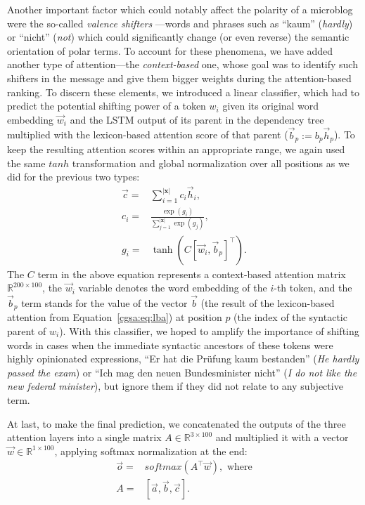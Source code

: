 Another important factor which could notably affect the polarity of a
microblog were the so-called \emph{valence shifters}
\cite[][]{Polanyi:06}---words and phrases such as ``kaum''
(\emph{hardly}) or ``nicht'' (\emph{not}) which could significantly
change (or even reverse) the semantic orientation of polar terms.  To
account for these phenomena, we have added another type of
attention---the \emph{context-based} one, whose goal was to identify
such shifters in the message and give them bigger weights during the
attention-based ranking.  To discern these elements, we introduced a
linear classifier, which had to predict the potential shifting power
of a token $w_i$ given its original word embedding $\vec{w}_i$ and the
LSTM output of its parent in the dependency tree multiplied with the
lexicon-based attention score of that parent ($\vec{b}_p :=
b_p\vec{h}_p$).  To keep the resulting attention scores within an
appropriate range, we again used the same $tanh$ transformation and
global normalization over all positions as we did for the previous two
types:
\begin{align*}
  \vec{c} =& \sum_{i=1}^{|\mathbf{x}|}c_i\vec{h}_i,\\ c_i =&
  \frac{\exp(g_i)}{\sum_{j=1}^{|\mathbf{x}|}\exp(g_j)},\\ g_i =&
  \tanh\left(C [\vec{w}_i, \vec{b}_p]^\top\right).
\end{align*}
The $C$ term in the above equation represents a context-based
attention matrix $\mathbb{R}^{200 \times 100}$, the $\vec{w}_i$
variable denotes the word embedding of the $i$-th token, and the
$\vec{b}_p$ term stands for the value of the vector $\vec{b}$ (the
result of the lexicon-based attention from Equation~\ref{cgsa:eq:lba})
at position $p$ (the index of the syntactic parent of $w_i$).  With
this classifier, we hoped to amplify the importance of shifting words
in cases when the immediate syntactic ancestors of these tokens were
highly opinionated expressions, \eg{} ``Er hat die Pr\"ufung kaum
bestanden'' (\textit{He hardly passed the exam}) or ``Ich mag den
neuen Bundesminister nicht'' (\textit{I do not like the new federal
  minister}), but ignore them if they did not relate to any subjective
term.

At last, to make the final prediction, we concatenated the outputs of
the three attention layers into a single matrix $A\in\mathbb{R}^{3
  \times 100}$ and multiplied it with a vector
$\vec{w}\in\mathbb{R}^{1\times 100}$, applying softmax normalization
at the end:
\begin{align*}
  \vec{o} =& softmax\left(A^\top\vec{w}\right),\textrm{ where}\\
  A =& [\vec{a}, \vec{b}, \vec{c}].
\end{align*}

